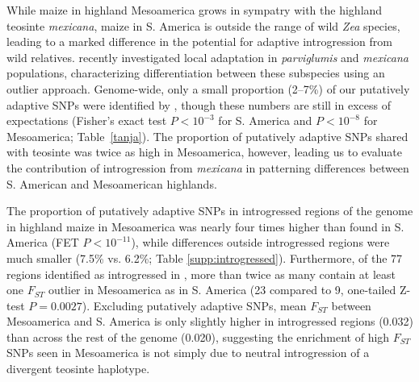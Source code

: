 While maize in highland Mesoamerica grows in sympatry with the highland teosinte \textit{mexicana}, maize in S. America is outside the range of wild \textit{Zea} species, leading to a marked difference in the potential for adaptive introgression from wild relatives.
\citet{Pyhajarvi2013} recently investigated local adaptation in \textit{parviglumis} and \textit{mexicana} populations, characterizing differentiation between these subspecies using an outlier approach.
Genome-wide, only a small proportion (2--7\%) of our putatively adaptive SNPs were identified by \citet{Pyhajarvi2013}, though these numbers are still in excess of expectations (Fisher's exact test $P<10^{-3}$ for S. America and $P<10^{-8}$ for Mesoamerica; Table~\ref{tanja}).
The proportion of putatively adaptive SNPs shared with teosinte was twice as high in Mesoamerica, however, 
leading us to evaluate the contribution of introgression  from \textit{mexicana} \cite[]{Profford_2013} in patterning differences between S. American and Mesoamerican highlands.  

The proportion of putatively adaptive SNPs in introgressed regions of the genome in highland maize in Mesoamerica was nearly four times higher than found in S. America (FET $P<10^{-11}$), while differences outside introgressed regions were much smaller (7.5\% vs. 6.2\%; Table \ref{supp:introgressed}). 
Furthermore, of the 77 regions identified as introgressed in \cite{Profford_2013}, more than twice as many contain at least one $F_{ST}$ outlier in Mesoamerica as in S. America (23 compared to 9, one-tailed Z-test $P=0.0027$).
Excluding  putatively adaptive SNPs, mean $F_{ST}$ between Mesoamerica and S. America is only slightly higher in introgressed regions (0.032) than across the rest of the genome (0.020), suggesting the enrichment of high $F_{ST}$ SNPs seen in Mesoamerica is not simply due to neutral introgression of a divergent teosinte haplotype.  




    
